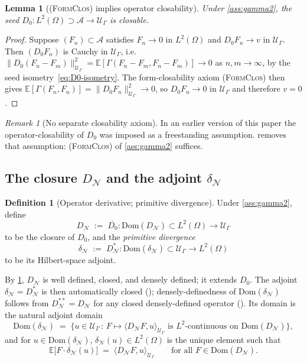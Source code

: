 \documentclass[11pt,reqno]{amsart}
\theoremstyle{plain}
\newtheorem{lemma}[theorem]{Lemma}
\theoremstyle{definition}
\newtheorem{definition}[theorem]{Definition}
\theoremstyle{remark}
\newtheorem{remark}[theorem]{Remark}
\newcommand{\E}{\mathbb{E}}
\newcommand{\Dom}{\mathrm{Dom}}
\newcommand{\cA}{\mathcal A}
\newcommand{\cN}{\mathcal N}
\newcommand{\cU}{\mathcal U}
\newcommand{\dN}{D_{\cN}}
\newcommand{\divN}{\delta_{\cN}}
\begin{document}
\begin{lemma}[\textsc{(FormClos)} implies operator closability]\label{lem:formclos-implies-opclos}
Under \cref{ass:gamma2}, the seed
$D_{0}\colon L^{2}(\Omega)\supset\cA\to\cU_{\Gamma}$ is closable.
\end{lemma}

\begin{proof}
Suppose $(F_{n})\subset\cA$ satisfies $F_{n}\to 0$ in $L^{2}(\Omega)$
and $D_{0}F_{n}\to v$ in $\cU_{\Gamma}$. Then $(D_{0}F_{n})$ is
Cauchy in $\cU_{\Gamma}$, i.e.\
$\|D_{0}(F_{n}-F_{m})\|_{\cU_{\Gamma}}^{2}
=\E[\Gamma(F_{n}-F_{m},F_{n}-F_{m})]\to 0$ as $n,m\to\infty$, by
the seed isometry~\eqref{eq:D0-isometry}. The form-closability
axiom \textsc{(FormClos)} then gives
$\E[\Gamma(F_{n},F_{n})]=\|D_{0}F_{n}\|_{\cU_{\Gamma}}^{2}\to 0$,
so $D_{0}F_{n}\to 0$ in $\cU_{\Gamma}$ and therefore $v=0$.
\end{proof}

\begin{remark}[No separate closability axiom]\label{rem:no-separate-closability}
In an earlier version of this paper the operator-closability of
$D_{0}$ was imposed as a freestanding assumption.
 removes that assumption:
\textsc{(FormClos)} of \cref{ass:gamma2} suffices.
\end{remark}

\subsection{\texorpdfstring{The closure $\dN$ and the adjoint $\divN$}{The closure D\_N and the adjoint delta\_N}}\label{sec:closure-DN}

\begin{definition}[Operator derivative; primitive divergence]\label{def:DN}
Under \cref{ass:gamma2}, define
\[
  \dN\;:=\;\overline{D_{0}}\colon\Dom(\dN)\subset L^{2}(\Omega)\to\cU_{\Gamma}
\]
to be the closure of $D_{0}$, and the \emph{primitive
divergence}
\[
  \divN\;:=\;\dN^{*}\colon\Dom(\divN)\subset\cU_{\Gamma}\to L^{2}(\Omega)
\]
to be its Hilbert-space adjoint.
\end{definition}

By \cref{lem:formclos-implies-opclos}, $\dN$ is well defined,
closed, and densely defined; it extends $D_{0}$. The adjoint
$\divN=\dN^{*}$ is then automatically closed
(\cite[Thm.~13.9]{Rudin-FA}); densely-definedness of $\Dom(\divN)$
follows from $\dN^{**}=\dN$ for any closed densely-defined
operator (\cite[Ch.~5]{Schmuedgen}). Its domain is the natural
adjoint domain
\begin{equation}\label{eq:Dom-divN}
  \Dom(\divN)
  \;=\;\bigl\{u\in\cU_{\Gamma}\,:\,
    F\mapsto\langle\dN F,u\rangle_{\cU_{\Gamma}}\text{ is }L^{2}\text{-continuous on }\Dom(\dN)\bigr\},
\end{equation}
and for $u\in\Dom(\divN)$, $\divN(u)\in L^{2}(\Omega)$ is the
unique element such that
\begin{equation}\label{eq:divN-defining}
  \E\!\bigl[F\cdot\divN(u)\bigr]
  \;=\;\langle\dN F,u\rangle_{\cU_{\Gamma}}
  \qquad\text{for all }F\in\Dom(\dN).
\end{equation}
\end{document}
